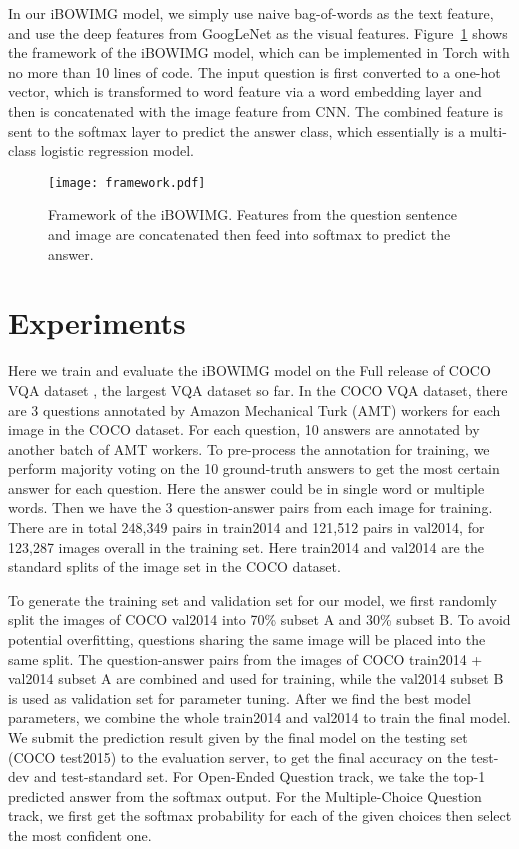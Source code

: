 \documentclass{article} \usepackage{nips14submit_e,times}
\begin{document}
In our iBOWIMG model, we simply use naive bag-of-words as the text feature, and use the deep features from GoogLeNet \cite{szegedy2014going} as the visual features. Figure~\ref{vqa_framework} shows the framework of the iBOWIMG model, which can be implemented in Torch with no more than 10 lines of code. The input question is first converted to a one-hot vector, which is transformed to word feature via a word embedding layer and then is concatenated with the image feature from CNN. The combined feature is sent to the softmax layer to predict the answer class, which essentially is a multi-class logistic regression model.

\begin{figure}
\begin{center}
\texttt{[image: framework.pdf]}
\end{center}
\caption{Framework of the iBOWIMG. Features from the question sentence and image are concatenated then feed into softmax to predict the answer.}\label{vqa_framework}
\end{figure}




\section{Experiments}
Here we train and evaluate the iBOWIMG model on the Full release of COCO VQA dataset \cite{antol2015vqa}, the largest VQA dataset so far. In the COCO VQA dataset, there are 3 questions annotated by Amazon Mechanical Turk (AMT) workers for each image in the COCO dataset. For each question, 10 answers are annotated by another batch of AMT workers. To pre-process the annotation for training, we perform majority voting on the 10 ground-truth answers to get the most certain answer for each question. Here the answer could be in single word or multiple words. Then we have the 3 question-answer pairs from each image for training. There are in total 248,349 pairs in train2014 and 121,512 pairs in val2014, for 123,287 images overall in the training set. Here train2014 and val2014 are the standard splits of the image set in the COCO dataset. 

To generate the training set and validation set for our model, we first randomly split the images of COCO val2014 into 70\% subset A and 30\% subset B. To avoid potential overfitting, questions sharing the same image will be placed into the same split. The question-answer pairs from the images of COCO train2014 + val2014 subset A are combined and used for training, while the val2014 subset B is used as validation set for parameter tuning. After we find the best model parameters, we combine the whole train2014 and val2014 to train the final model. We submit the prediction result given by the final model on the testing set (COCO test2015) to the evaluation server, to get the final accuracy on the test-dev and test-standard set. For Open-Ended Question track, we take the top-1 predicted answer from the softmax output. For the Multiple-Choice Question track, we first get the softmax probability for each of the given choices then select the most confident one.
\end{document}
